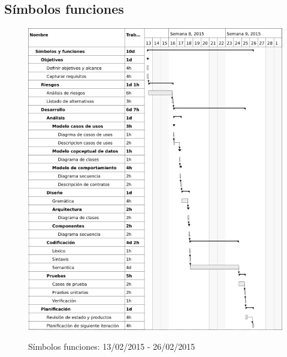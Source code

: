 \subsection{Símbolos funciones}
\begin{center}
\begin{figure}[H]
\centering
\includegraphics[scale=1]{planning/13-simbolos-funciones.png} \\
\caption{Símbolos funciones: 13/02/2015 - 26/02/2015 }
\end{figure}
\end{center}


